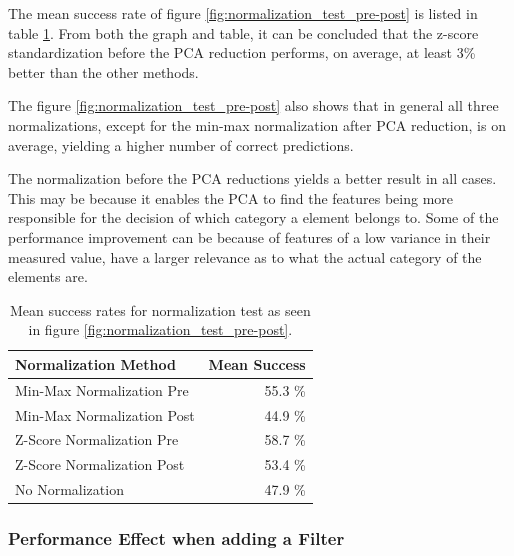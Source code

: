 The mean success rate of figure \ref{fig:normalization_test_pre-post} is listed in table \ref{tab:meanSuccess_normalization_test_pre-post}.
From both the graph and table, it can be concluded that the z-score standardization before the PCA reduction performs, on average, at least 3\% better than the other methods.

The figure \ref{fig:normalization_test_pre-post} also shows that in general all three normalizations, except for the min-max normalization after PCA reduction, is on average, yielding a higher number of correct predictions.

The normalization before the PCA reductions yields a better result in all cases. 
This may be because it enables the PCA to find the features being more responsible for the decision of which category a element belongs to. 
Some of the performance improvement can be because of features of a low variance in their measured value, have a larger relevance as to what the actual category of the elements are.


\begin{table}[H]
\centering
\begin{tabular}{|l|r|}\hline
Normalization Method & Mean Success \\ \hline
Min-Max Normalization Pre & 55.3 \% \\ \hline
Min-Max Normalization Post & 44.9 \% \\ \hline
Z-Score Normalization Pre & 58.7 \% \\ \hline
Z-Score Normalization Post & 53.4  \% \\ \hline
No Normalization & 47.9 \% \\ \hline
\end{tabular}
\caption{Mean success rates for normalization test as seen in figure \ref{fig:normalization_test_pre-post}.}
\label{tab:meanSuccess_normalization_test_pre-post}
\end{table}



\subsubsection{Performance Effect when adding a Filter}

